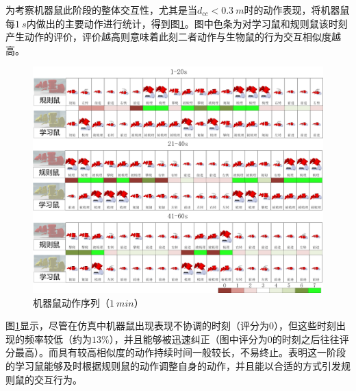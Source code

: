 为考察机器鼠此阶段的整体交互性，尤其是当$d_{cc}<0.3~m$时的动作表现，将机器鼠每$1~s$内做出的主要动作进行统计，得到图\ref{figure_actionseq}。图中色条为对学习鼠和规则鼠该时刻产生动作的评价，评价越高则意味着此刻二者动作与生物鼠的行为交互相似度越高。
\begin{figure}[htb]
  \vspace{13pt}
  \centering
  \includegraphics[width=1\linewidth]{images/ch05/mature/actionseq.png}
  \caption{机器鼠动作序列（$1~min$）}\label{figure_actionseq}
\end{figure}

图\ref{figure_actionseq}显示，尽管在仿真中机器鼠出现表现不协调的时刻（评分为0），但这些时刻出现的频率较低（约为$13\%$），并且能够被迅速纠正（图中评分为0的时刻之后往往评分最高）。而具有较高相似度的动作持续时间一般较长，不易终止。表明这一阶段的学习鼠能够及时根据规则鼠的动作调整自身的动作，并且能以合适的方式引发规则鼠的交互行为。